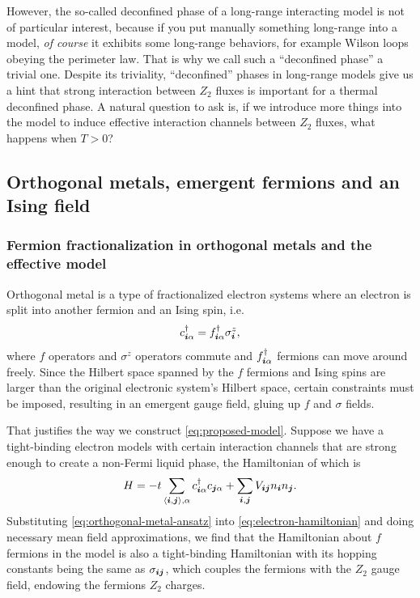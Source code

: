 \documentclass[hyperref, a4paper]{article}
\newcommand*{\pair}[1]{\langle #1 \rangle}
\newcommand*{\Ztwo}{\texorpdfstring{$\mathbb{Z}_2$ }{Z2 }}
\def\mathbb#1{#1}%
\begin{document}
However, the so-called deconfined phase of a long-range interacting model is not of particular interest, because if you put manually something long-range into a model, \emph{of course} it exhibits some long-range behaviors, for example Wilson loops obeying the perimeter law.
That is why we call such a ``deconfined phase'' a trivial one.
Despite its triviality, ``deconfined'' phases in long-range models give us a hint that strong interaction between \Ztwo fluxes is important for a thermal deconfined phase.
A natural question to ask is, if we introduce more things into the model to induce effective interaction channels between \Ztwo fluxes, what happens when $T > 0$?

\subsection{Orthogonal metals, emergent fermions and an Ising field}

\subsubsection{Fermion fractionalization in orthogonal metals and the effective model}

Orthogonal metal is a type of fractionalized electron systems where an electron is split into another fermion and an Ising spin, i.e.
\begin{equation}
    c^\dagger_{\vb*{i} \alpha} = f^\dagger_{\vb*{i} \alpha} \sigma^z_{\vb*{i}}, 
    \label{eq:orthogonal-metal-ansatz}
\end{equation}
where $f$ operators and $\sigma^z$ operators commute and $f^\dagger_{\vb*{i} \alpha}$ fermions can move around freely. 
Since the Hilbert space spanned by the $f$ fermions and Ising spins are larger than the original electronic system's Hilbert space, certain constraints must be imposed, resulting in an emergent gauge field, gluing up $f$ and $\sigma$ fields.

That justifies the way we construct \eqref{eq:proposed-model}.
Suppose we have a tight-binding electron models with certain interaction channels that are strong enough to create a non-Fermi liquid phase, the Hamiltonian of which is 
\begin{equation}
    H = - t \sum_{\pair{\vb*{i}, \vb*{j}}, \alpha} c^\dagger_{\vb*{i} \alpha} c_{\vb*{j} \alpha} + \sum_{\vb*{i}, \vb*{j}} V_{\vb*{i} \vb*{j}} n_{\vb*{i}} n_{\vb*{j}}.
    \label{eq:electron-hamiltonian}
\end{equation}
Substituting \eqref{eq:orthogonal-metal-ansatz} into \eqref{eq:electron-hamiltonian} and doing necessary mean field approximations, we find that the Hamiltonian about $f$ fermions in the model is also a tight-binding Hamiltonian with its hopping constants being the same as $\sigma_{\vb*{i} \vb*{j}}$, which couples the fermions with the \Ztwo gauge field, endowing the fermions \Ztwo charges.
\end{document}
